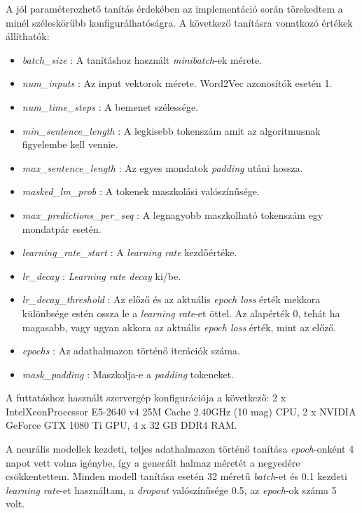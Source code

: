 A jól paraméterezhető tanítás érdekében az implementáció során törekedtem a minél széleskörűbb konfigurálhatóságra. A következő tanításra vonatkozó értékek állíthatók:
\begin{itemize}
	\item \textit{batch\_size} : A tanításhoz használt \textit{minibatch}-ek mérete.
	\item \textit{num\_inputs} : Az input vektorok mérete. Word2Vec azonosítók esetén 1.
	\item \textit{num\_time\_steps} : A bemenet szélessége.
	\item \textit{min\_sentence\_length} : A legkisebb tokenszám amit az algoritmusnak figyelembe kell vennie.
	\item \textit{max\_sentence\_length} : Az egyes mondatok \textit{padding} utáni hossza.
	\item \textit{masked\_lm\_prob} : A tokenek maszkolási valószínűsége.
	\item \textit{max\_predictions\_per\_seq} : A legnagyobb maszkolható tokenszám egy mondatpár esetén.
	
	\item \textit{learning\_rate\_start} : A \textit{learning rate} kezdőértéke.
	\item \textit{lr\_decay} : \textit{Learning rate decay} ki/be.
	\item \textit{lr\_decay\_threshold} : Az előző és az aktuális \textit{epoch loss} érték mekkora különbsége estén ossza le a \textit{learning rate}-et öttel. Az alapérték 0, tehát ha magasabb, vagy ugyan akkora az aktuális \textit{epoch loss} érték, mint az előző.
	\item \textit{epochs} : Az adathalmazon történő iterációk száma.
	\item \textit{mask\_padding} : Maszkolja-e a \textit{padding} tokeneket.
\end{itemize}

A futtatáshoz használt szervergép konfigurációja a következő: 2 x Intel\textregistered Xeon\textregistered  Processor E5-2640 v4 25M Cache 2.40GHz (10 mag) CPU, 2 x NVIDIA GeForce GTX 1080 Ti GPU, 4 x 32 GB DDR4 RAM.

A neurális modellek kezdeti, teljes adathalmazon történő tanítása \textit{epoch}-onként 4 napot vett volna igénybe, így a generált halmaz méretét a negyedére csökkentettem. Minden modell tanítása esetén 32 méretű \textit{batch}-et és 0.1 kezdeti \textit{learning rate}-et használtam, a \textit{dropout} valószínűsége 0.5, az \textit{epoch}-ok száma 5 volt.

